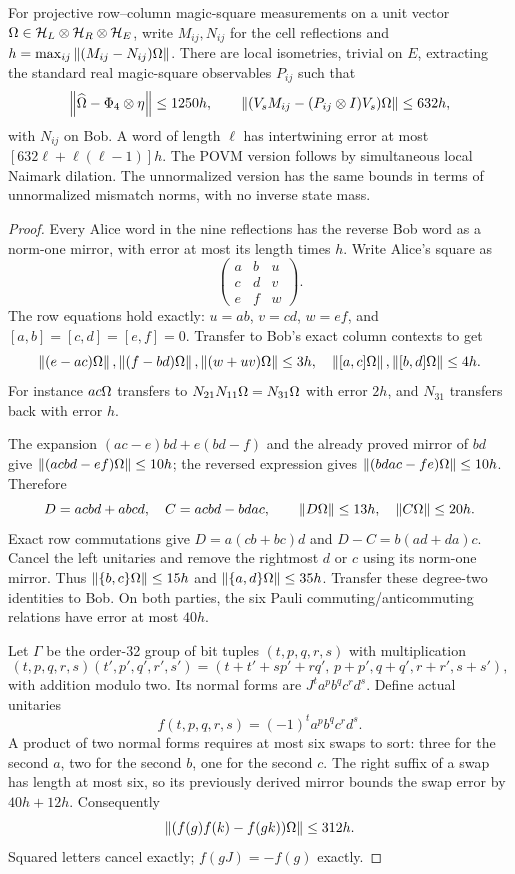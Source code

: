 \begin{lemma}\label{dec:lem:magic}
For projective row--column magic-square measurements on a unit vector $\Omega\in\mathcal H_L\otimes\mathcal H_R\otimes\mathcal H_E$, write $M_{ij},N_{ij}$ for the cell reflections and $h=\max_{ij}\left\lVert(M_{ij}-N_{ij})\Omega\right\rVert$. There are local isometries, trivial on $E$, extracting the standard real magic-square observables $P_{ij}$ such that
\[
\left\lVert\widehat{\Omega}-\Phi_4\otimes\eta\right\rVert\le1250h,
\qquad
\left\lVert(V_sM_{ij}-(P_{ij}\otimes I)V_s)\Omega\right\rVert\le632h,
\]
with $N_{ij}$ on Bob. A word of length $\ell$ has intertwining error at most
$[632\ell+\ell(\ell-1)]h$. The POVM version follows by simultaneous local Naimark dilation. The unnormalized version has the same bounds in terms of unnormalized mismatch norms, with no inverse state mass.
\end{lemma}
\begin{proof}
Every Alice word in the nine reflections has the reverse Bob word as a norm-one mirror, with error at most its length times $h$. Write Alice's square as
\[
\begin{pmatrix}a&b&u\\c&d&v\\e&f&w\end{pmatrix}.
\]
The row equations hold exactly: $u=ab$, $v=cd$, $w=ef$, and $[a,b]=[c,d]=[e,f]=0$. Transfer to Bob's exact column contexts to get
\[
\left\lVert(e-ac)\Omega\right\rVert,\left\lVert(f-bd)\Omega\right\rVert,\left\lVert(w+uv)\Omega\right\rVert\le3h,
\quad\left\lVert[a,c]\Omega\right\rVert,\left\lVert[b,d]\Omega\right\rVert\le4h.
\]
For instance $ac\Omega$ transfers to $N_{21}N_{11}\Omega=N_{31}\Omega$ with error $2h$, and $N_{31}$ transfers back with error $h$.

The expansion $(ac-e)bd+e(bd-f)$ and the already proved mirror of $bd$ give
$\left\lVert(acbd-ef)\Omega\right\rVert\le10h$; the reversed expression gives
$\left\lVert(bdac-fe)\Omega\right\rVert\le10h$. Therefore
\[
D=acbd+abcd,\quad C=acbd-bdac,
\qquad\left\lVert D\Omega\right\rVert\le13h,\quad\left\lVert C\Omega\right\rVert\le20h.
\]
Exact row commutations give $D=a(cb+bc)d$ and $D-C=b(ad+da)c$. Cancel the left unitaries and remove the rightmost $d$ or $c$ using its norm-one mirror. Thus
$\left\lVert\{b,c\}\Omega\right\rVert\le15h$ and $\left\lVert\{a,d\}\Omega\right\rVert\le35h$. Transfer these degree-two identities to Bob. On both parties, the six Pauli commuting/anticommuting relations have error at most $40h$.

Let $\Gamma$ be the order-32 group of bit tuples $(t,p,q,r,s)$ with multiplication
\[
(t,p,q,r,s)(t',p',q',r',s')
=(t+t'+sp'+rq',\,p+p',q+q',r+r',s+s'),
\]
with addition modulo two. Its normal forms are $J^ta^pb^qc^rd^s$. Define actual unitaries
\[
f(t,p,q,r,s)=(-1)^ta^pb^qc^rd^s.
\]
A product of two normal forms requires at most six swaps to sort: three for the second $a$, two for the second $b$, one for the second $c$. The right suffix of a swap has length at most six, so its previously derived mirror bounds the swap error by $40h+12h$. Consequently
\begin{equation}\label{dec:eq:mult}
\left\lVert(f(g)f(k)-f(gk))\Omega\right\rVert\le312h.
\end{equation}
Squared letters cancel exactly; $f(gJ)=-f(g)$ exactly.


\end{proof}
